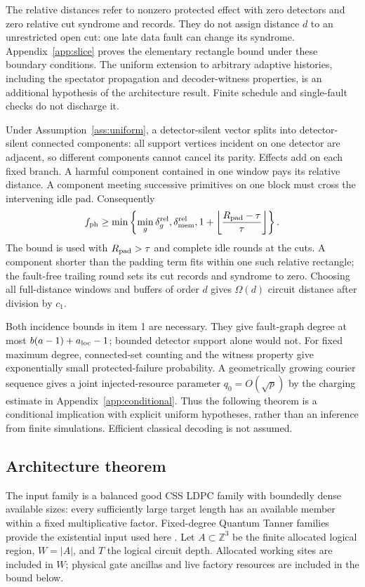 The relative distances refer to nonzero protected effect with zero
detectors and zero relative cut syndrome and records. They do not assign
distance $d$ to an unrestricted open cut: one late data fault can change
its syndrome. Appendix~\ref{app:slice} proves the elementary rectangle
bound under these boundary conditions. The uniform extension to arbitrary
adaptive histories, including the spectator propagation and decoder-witness
properties, is an additional hypothesis of the architecture result.
Finite schedule and single-fault checks do not discharge it.

Under Assumption~\ref{ass:uniform}, a detector-silent vector splits into
detector-silent connected components: all support vertices incident on one
detector are adjacent, so different components cannot cancel its parity.
Effects add on each fixed branch. A harmful component contained in one
window pays its relative distance. A component meeting successive
primitives on one block must cross the intervening idle pad. Consequently
\begin{equation}
 f_{\rm ph}\ge\min\left\{
 \min_g\delta_g^{\rm rel},\delta_{\rm mem}^{\rm rel},
 1+\left\lfloor\frac{R_{\rm pad}-\tau}{\tau}\right\rfloor
 \right\}.
 \label{eq:composition}
\end{equation}
The bound is used with $R_{\rm pad}>\tau$ and complete idle rounds at the
cuts. A component shorter than the padding term fits within one such
relative rectangle; the fault-free trailing round sets its cut records
and syndrome to zero. Choosing all full-distance windows and buffers of
order $d$ gives $\Omega(d)$ circuit distance after division by $c_1$.

Both incidence bounds in item 1 are necessary. They give fault-graph degree
at most $b(a-1)+a_{\rm loc}-1$; bounded detector support alone would not.
For fixed maximum degree, connected-set counting and the witness property
give exponentially small protected-failure probability. A geometrically
growing courier sequence gives a joint injected-resource parameter
$q_0=O(\sqrt p)$ by the charging estimate in
Appendix~\ref{app:conditional}. Thus the following theorem is a conditional
implication with explicit uniform hypotheses, rather than an inference
from finite simulations. Efficient classical decoding is not assumed.

\subsection{Architecture theorem}
The input family is a balanced good CSS LDPC family with boundedly dense
available sizes: every sufficiently large target length has an available
member within a fixed multiplicative factor. Fixed-degree Quantum Tanner
families provide the existential input used here
\cite{LeverrierZemorTanner,DinurLTC}. Let $A\subset\mathbb Z^3$ be the finite
allocated logical region, $W=|A|$, and $T$ the logical circuit depth. Allocated
working sites are included in $W$; physical gate ancillas and live factory
resources are included in the bound below.

